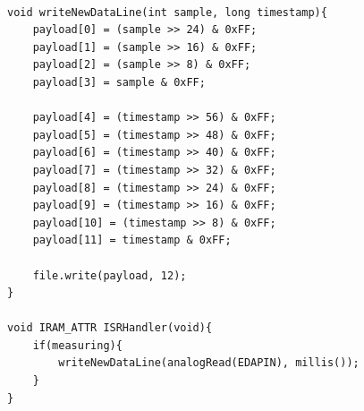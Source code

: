 \begin{verbatim}

void writeNewDataLine(int sample, long timestamp){
    payload[0] = (sample >> 24) & 0xFF;
    payload[1] = (sample >> 16) & 0xFF;
    payload[2] = (sample >> 8) & 0xFF;
    payload[3] = sample & 0xFF;  

    payload[4] = (timestamp >> 56) & 0xFF;
    payload[5] = (timestamp >> 48) & 0xFF;
    payload[6] = (timestamp >> 40) & 0xFF;
    payload[7] = (timestamp >> 32) & 0xFF;
    payload[8] = (timestamp >> 24) & 0xFF;
    payload[9] = (timestamp >> 16) & 0xFF;
    payload[10] = (timestamp >> 8) & 0xFF;
    payload[11] = timestamp & 0xFF;

    file.write(payload, 12);
}

void IRAM_ATTR ISRHandler(void){
    if(measuring){
        writeNewDataLine(analogRead(EDAPIN), millis());
    }
}

\end{verbatim}


